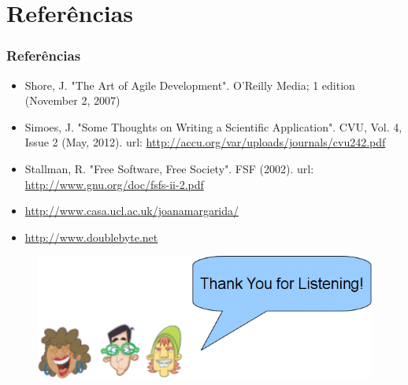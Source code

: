 \documentclass[hyperref={pdfpagelabels=true}]{beamer}
\begin{document}
\section{Refer\^{e}ncias}
\begin{frame}
\frametitle{Refer\^{e}ncias}
\small{
\begin{itemize}
\item Shore, J. "The Art of Agile Development". O'Reilly Media; 1 edition (November 2, 2007)
\item Simoes, J. "Some Thoughts on Writing a Scientific Application". CVU, Vol. 4, Issue 2 (May, 2012). url: \url{http://accu.org/var/uploads/journals/cvu242.pdf}
\item Stallman, R. "Free Software, Free Society". FSF (2002). url: \url{http://www.gnu.org/doc/fsfs-ii-2.pdf}
\item \url{http://www.casa.ucl.ac.uk/joanamargarida/}
\item \url{http://www.doublebyte.net}
\end{itemize}
}
\begin{figure}
\includegraphics[scale=0.3]{thanks.png}
\end{figure}
\end{frame}
\end{document}
